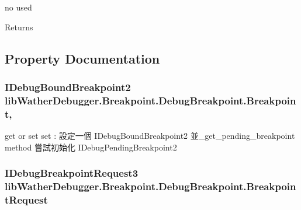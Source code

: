 no used 

\begin{DoxyReturn}{Returns}

\end{DoxyReturn}


\subsection{Property Documentation}
\hypertarget{classlib_wather_debugger_1_1_breakpoint_1_1_debug_breakpoint_a3b12998bd185af638e6f614aed9f900c}{
\subsubsection[{Breakpoint}]{\setlength{\rightskip}{0pt plus 5cm}I\+Debug\+Bound\+Breakpoint2 lib\+Wather\+Debugger.\+Breakpoint.\+Debug\+Breakpoint.\+Breakpoint\hspace{0.3cm}{\ttfamily [get]}, {\ttfamily [set]}}}\label{classlib_wather_debugger_1_1_breakpoint_1_1_debug_breakpoint_a3b12998bd185af638e6f614aed9f900c}


get or set set \+: 設定一個 I\+Debug\+Bound\+Breakpoint2 並\+\_\+get\+\_\+pending\+\_\+breakpoint method 嘗試初始化 I\+Debug\+Pending\+Breakpoint2 

\hypertarget{classlib_wather_debugger_1_1_breakpoint_1_1_debug_breakpoint_a8af7178908fb4158f3b5cd412555a931}{
\subsubsection[{Breakpoint\+Request}]{\setlength{\rightskip}{0pt plus 5cm}I\+Debug\+Breakpoint\+Request3 lib\+Wather\+Debugger.\+Breakpoint.\+Debug\+Breakpoint.\+Breakpoint\+Request\hspace{0.3cm}{\ttfamily [get]}}}\label{classlib_wather_debugger_1_1_breakpoint_1_1_debug_breakpoint_a8af7178908fb4158f3b5cd412555a931}


